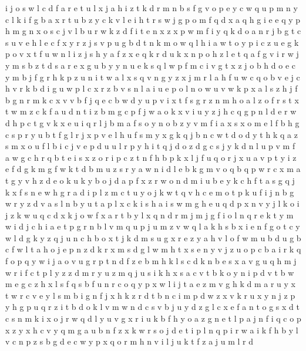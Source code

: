 \documentclass{article}
\begin{document}
i j o s w l c d f a r e t u
l x j a h i z t k d r m n b s f g v o p e y c w q u
p m n y c l k i f g b a x r t
u b z y c k v l e i h t r s w j g p o m f q d x a
q h g i e
e q y p h m g n x o s c j v l b u r w k z d f i
t e n x
z x p w m f i y q k d o a n r j b g t c s u v e h l
e c f x y r z j s v p u g b d t n k m o w q l h i a
w t o y p i c z u
e g k p o v x t f u w n l i z j s h y a
f z x e q k r
d u k x n p o h z l e t q a f g v i r w j y m s b
z t d s a r e x g u b y
y n u e k s q l w p f m c i v g t x z j o b h
d o e c y m b j f g r h k p z u n i t w a l x s q v
n g y z x j m r l a h f u w c q o b v e
j c h v r k b d i g u w p l
c x r z b v s n l a i u e
p o l n
o w
u v w k p x
a l s
z h j f b g n r m k c x v
v b f
j q e c b w d y u p v i x t f s g r z n m h o a l
z o f r s t x
t w m z c k f a
u d n t i z b m g c p f j w a o k x v
i u y z j h c q g p n l d e r
w d h p c t g v k x e u i q r l j b m a f s o y n
o b z y v m f i a x s
x o m e l f b
h g c s p
r y
u b t f g l r j x p
v e l h u f s m y x g k q j b n c w t d o
d y t h k q a z s m x o u f l b i c j v e p
d u
u l r p y h i t q j d
o z d g c s
j y k d n l u p v m f a w g c h r q b t e i s x z o
r i p c z t
n f h b p k x
l j f u q
o r j x u a v p t y i z e f d g k m
g f w k t d b m
u z s r y a w n i d l e b k g m v o q
b q p w r c x m a t g y v h z d e o k u
k y b o j d a p f x z
r w o n d m i u b e y k c h f t a s g q j
k x f s n e w h g r a d i p l z m c t u y o j
k w t q v
h c e m o t p k u f i j n b g w r y z d v a s l
n b y u t a p l x c k i s h
a i s w m g h e u q d p x n v y j l k
o i j z k w u q c d x
k j o w f x a r t b y
l x q n d r m j
m j g f i o l n q r e k t y
m w i
d j c h i a e t p g r n b l v m q u
p j u m z v w q l a k h s b x i e n f g o t c y
w
l d
g k y z q j u n c h
b o x t j k d m s u
g x r e z y a h v l o f w m u b d
u g b c f w l t a h o j e p n z d k r x m s
d g l w m h t x s e n y v j z u o p c b a i r k q f
o p
q y w i j a o v u g r p t n d f z e b m h k l s c
d k n b e s x a v g u q h m j w r i f c t p l y z
z d m r y u
z m q j u s
i k h x s a c v t b
k o y n i p d v t b w m e g c z h x l s f q
s b f u n r c o q y p x w l i j t a e z m v g h k d
m a r u y x
t w r c v e y l s m b i g n f j x h k z
r d
t b n c i m p d w z x v k r u
x y n j z p
y h g p u q r z i t b d o k l v m w
n d c s v
b j u y d z g l c x e f a n t
o g s x d
t c s n m k i x o j r w q d l y u v g
x r i u k b f h y o a z g n e t l p
a j n f i q c o p x z
y x
h c v y q m g a u b n f z x k w r s o j d e t i p l
n q p i
r w a i k f h b y l v c n p z
s b g d e c w y p x q o r m h n v i l j u k t f z a
j u m l r d
\end{document}
